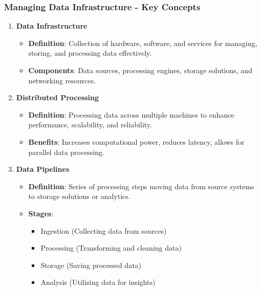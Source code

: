 \documentclass[aspectratio=169]{beamer}
\begin{document}
\begin{frame}[fragile]
    \frametitle{Managing Data Infrastructure - Key Concepts}
    \begin{enumerate}
        \item \textbf{Data Infrastructure}
            \begin{itemize}
                \item \textbf{Definition}: Collection of hardware, software, and services for managing, storing, and processing data effectively.
                \item \textbf{Components}: Data sources, processing engines, storage solutions, and networking resources.
            \end{itemize}
        
        \item \textbf{Distributed Processing}
            \begin{itemize}
                \item \textbf{Definition}: Processing data across multiple machines to enhance performance, scalability, and reliability.
                \item \textbf{Benefits}: Increases computational power, reduces latency, allows for parallel data processing.
            \end{itemize}
        
        \item \textbf{Data Pipelines}
            \begin{itemize}
                \item \textbf{Definition}: Series of processing steps moving data from source systems to storage solutions or analytics.
                \item \textbf{Stages}:
                    \begin{itemize}
                        \item Ingestion (Collecting data from sources)
                        \item Processing (Transforming and cleaning data)
                        \item Storage (Saving processed data)
                        \item Analysis (Utilizing data for insights)
                    \end{itemize}
            \end{itemize}
    \end{enumerate}
\end{frame}
\end{document}
